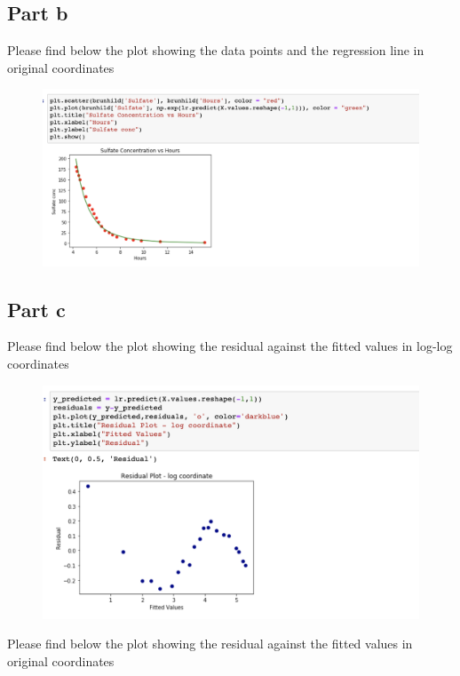 \documentclass{article}      %
\begin{document}
\subsection{Part b} Please find below the plot showing the data points and the regression line in original coordinates

\begin{figure}[H]
\centering
\includegraphics[width=\textwidth]{part3}
\end{figure}

\subsection{Part c} Please find below the plot showing the residual against the fitted values in log-log coordinates

\begin{figure}[H]
\centering
\includegraphics[width=\textwidth]{part4}
\end{figure}

Please find below the plot showing the residual against the fitted values in original coordinates
\end{document}
